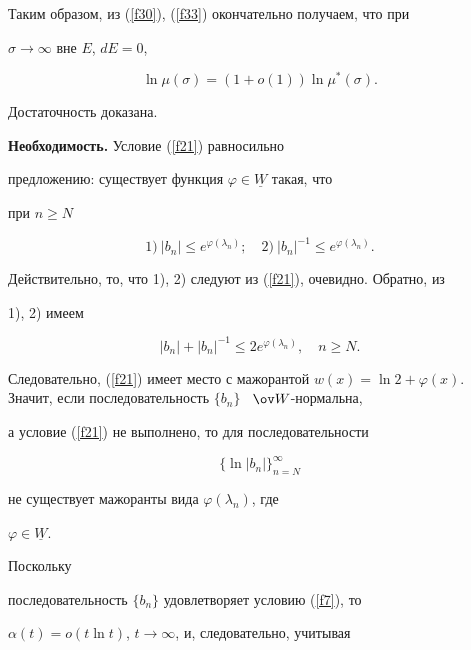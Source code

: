 Таким образом, из (\ref{f30}), (\ref{f33}) окончательно получаем, что при


$\sigma\to\infty$ вне $E$, $dE=0$,


$$


\ln \mu (\sigma)=(1+o(1))\ln \mu^{*}(\sigma).


$$





Достаточность доказана.





{\bf Необходимость.} Условие (\ref{f21}) равносильно


предложению: существует функция $\varphi\in \underline{W}$ такая, что


при $n\geq N$


$$


1) \ |b_{n}|\leq e^{\varphi(\lambda_{n})};\quad 2) \


|b_{n}|^{-1}\leq e^{\varphi(\lambda_{n})}.


$$


Действительно, то, что 1), 2) следуют из (\ref{f21}), очевидно. Обратно, из


1), 2) имеем


$$


|b_{n}|+|b_{n}|^{-1}\leq 2e^{\varphi (\lambda_{n})},\quad n\geq N.


$$


Следовательно, (\ref{f21}) имеет место с мажорантой $w(x)=\ln 2+\varphi


(x)$. Значит, если последовательность $\{b_n\}$ \ $\ov W$-нормальна,


а условие (\ref{f21}) не выполнено, то для последовательности


$$


\{\ln |b_{n}|\}_{n=N}^{\infty}


$$


не существует мажоранты вида $\varphi (\lambda_{n})$, где


$\varphi\in\underline{W}$. 






Поскольку


последовательность $\{b_{n}\}$ удовлетворяет условию (\ref{f7}), то 


$\alpha(t)=o(t\ln t)$, $t\to\infty$, и, следовательно, учитывая



